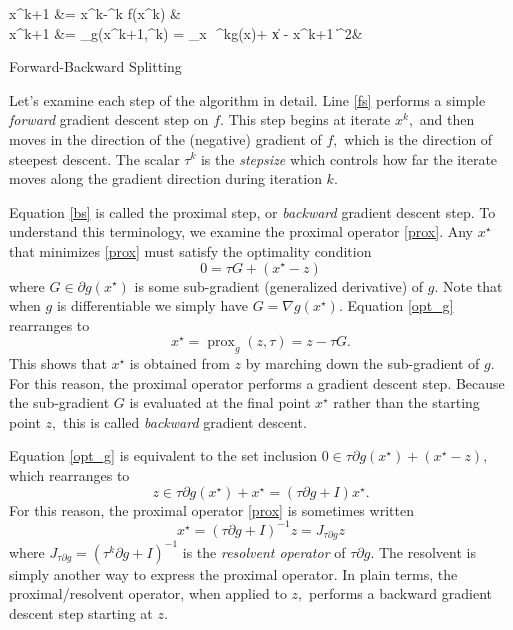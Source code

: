 \documentclass{amsart}
\newcommand{\eqn}[2]{\begin{equation}\label{#1}#2\end{equation}}
\newcommand{\opt}{^\star}
\DeclareMathOperator*{\argmin}{arg\,min}
\DeclareMathOperator{\prox}{prox}
\theoremstyle{definition}
\begin{document}
\begin{algorithm}[H]
\begin{algorithmic}
 \begin{flalign}
    \qquad \hat x^{k+1} &= x^k-\tau^k \nabla f(x^k) \label{fs}&\\
  \label{bs}   x^{k+1} &= \prox_g(\hat x^{k+1},\tau^k) = \argmin_x\,\, \tau^kg(x)+ \| x - \hat x^{k+1} \|^2&
  \end{flalign}
\EndWhile
\end{algorithmic}
\caption{Forward-Backward Splitting}
\label{alg:fbs}
\end{algorithm}
Let's examine each step of the algorithm in detail.  Line \eqref{fs} performs a simple {\em forward} gradient descent step on $f$.  This step begins at iterate $x^k,$ and then moves in the direction of the (negative) gradient of $f,$ which is the direction of steepest descent.  The scalar $\tau^k$ is the {\em stepsize} which controls how far the iterate moves along the gradient direction during iteration $k.$

Equation \eqref{bs} is called the proximal step, or {\em backward} gradient descent step.   To understand this terminology, we examine the proximal operator \eqref{prox}. Any $x\opt$  that minimizes \eqref{prox} must satisfy the optimality condition
   \eqn{opt_g}{
   0=  \tau G+( x\opt - z)
   }
  where  $G\in \partial g(x\opt)$ is some sub-gradient (generalized derivative) of $g.$ Note that when $g$ is differentiable we simply have $G = \nabla g(x\opt).$ Equation \eqref{opt_g} rearranges to 
   $$x\opt = \prox_g(z,\tau) = z-\tau G.$$
    This shows that $x\opt$ is obtained from $z$ by marching down the sub-gradient of $g.$ For this reason, the proximal operator performs a gradient descent step.  Because the sub-gradient $G$ is evaluated at the final point $x\opt$ rather than the starting point $z,$ this is called {\em backward} gradient descent.  
    
    Equation \eqref{opt_g} is equivalent to the set inclusion
    $0 \in \tau \partial  g(x\opt)+( x\opt - z),$
    which rearranges to 
    $$ z \in \tau  \partial  g(x\opt)+ x\opt = (\tau  \partial  g+ I) x\opt.$$
    For this reason, the proximal operator \eqref{prox} is sometimes written 
    $$x\opt = (\tau  \partial  g+ I)^{-1} z = J_{\tau\partial g} z$$
    where $J_{\tau\partial g}=(\tau^k  \partial  g+ I)^{-1}$ is the {\em resolvent operator} of $\tau  \partial  g.$  The resolvent is simply another way to express the proximal operator. In plain terms, the proximal/resolvent operator, when applied to $z,$  performs a backward gradient descent step starting at $z$.
    
\end{document}
